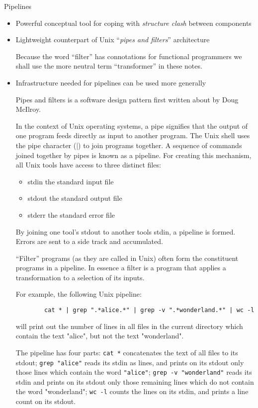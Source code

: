 \documentclass{concdistfoils}
\def\heading#1{\begin{cframed}[8.8in]{#1}\end{cframed}}
\begin{document}
\begin{slide}
\heading{Pipelines}
\vfill

\begin{itemize}
\item Powerful conceptual tool for coping with \textit{structure clash} between components
\item Lightweight counterpart of Unix ``\textit{pipes and filters}'' architecture
\begin{note}
Because the word ``filter'' has connotations for functional
programmers we shall use the more neutral term ``transformer'' in these notes.
\end{note}
\item Infrastructure needed for pipelines can be used more generally
\begin{note}
Pipes and filters is a software design pattern first written about by Doug
McIlroy.

In the context of Unix operating systems, a pipe signifies that
the output of one program feeds directly as input to another
program. The Unix shell uses the pipe character (|) to join programs
together. A sequence of commands joined together by pipes is known
as a pipeline. For creating this mechanism, all Unix tools have
access to three distinct files:

\begin{itemize}
\item stdin the standard input file 
\item stdout the standard output file 
\item stderr the standard error file
\end{itemize}

By joining one tool's stdout to another tools stdin, a pipeline is
formed. Errors are sent to a side track and accumulated.

``Filter'' programs (as they are called in Unix) often form the constituent programs in a pipeline. In essence
a filter is a program that applies a transformation to a selection of its
inputs. 

For example, the following Unix pipeline:

\begin{verbatim}
        cat * | grep ".*alice.*" | grep -v ".*wonderland.*" | wc -l
\end{verbatim}

will print out the number of lines in all files in the current
directory which contain the text "alice", but not the text
"wonderland".

The pipeline has four parts: \texttt{cat *} concatenates the text of all files
to its stdout; \texttt{grep "alice"} reads its stdin as lines, and prints on
its stdout only those lines which contain the word \texttt{"alice"}; 
\mbox{\texttt{grep -v "wonderland"}} reads its stdin and prints on its stdout only those
remaining lines which do not contain the word "wonderland"; \mbox{\texttt{wc -l}}
counts the lines on its stdin, and prints a line count on its stdout.
\end{note}
\end{itemize}

\vfill
\end{slide}
\end{document}
